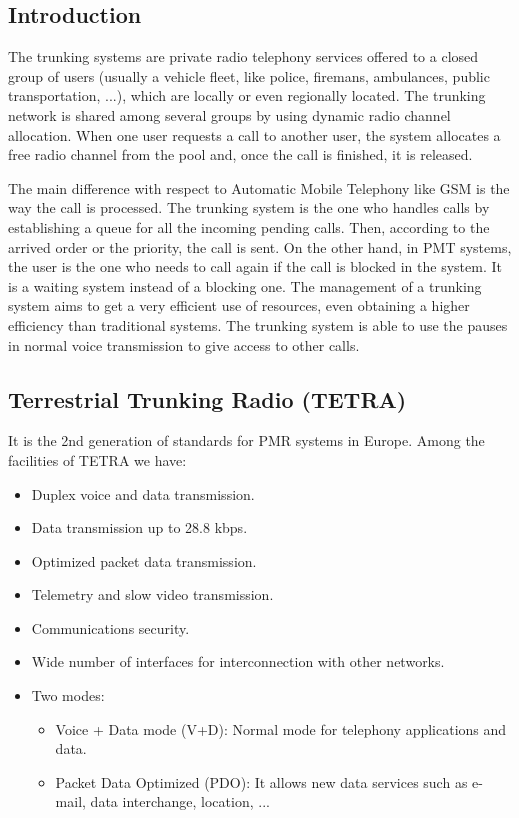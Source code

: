 \documentclass[
	12pt,
	twoside
]{book}
\begin{document}
\subsection{Introduction}

The trunking systems are private radio telephony services offered to a closed group of users (usually a vehicle fleet, like police, firemans, ambulances, public transportation, ...), which are locally or even regionally located. The trunking network is shared among several groups by using dynamic radio channel allocation. When one user requests a call to another user, the system allocates a free radio channel from the pool and, once the call is finished, it is released.

The main difference with respect to Automatic Mobile Telephony like GSM is the way the call is processed. The trunking system is the one who handles calls by establishing a queue for all the incoming pending calls. Then, according to the arrived order or the priority, the call is sent. On the other hand, in PMT systems, the user is the one who needs to call again if the call is blocked in the system. It is a waiting system instead of a blocking one. The management of a trunking system aims to get a very efficient use of resources, even obtaining a higher efficiency than traditional systems. The trunking system is able to use the pauses in normal voice transmission to give access to other calls.

\subsection{Terrestrial Trunking Radio (TETRA)}

It is the 2nd generation of standards for PMR systems in Europe. Among the facilities of TETRA we
have:

\begin{itemize}
	\item Duplex voice and data transmission.
	\item Data transmission up to 28.8 kbps.
	\item Optimized packet data transmission.
	\item Telemetry and slow video transmission.
	\item Communications security.
	\item Wide number of interfaces for interconnection with other networks.
	\item {
		Two modes:
		\begin{itemize}
			\item Voice + Data mode (V+D): Normal mode for telephony applications and data.
			\item Packet Data Optimized (PDO): It allows new data services such as e-mail, data interchange, location, ...
		\end{itemize}
	}
\end{itemize}
\end{document}

